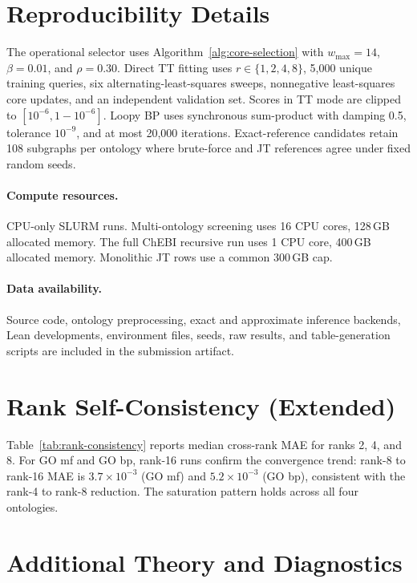 \documentclass[12pt]{article}
\begin{document}
\section{Reproducibility Details}
\label{app:reproducibility}

The operational selector uses Algorithm~\ref{alg:core-selection} with
$w_{\max}=14$, $\beta=0.01$, and $\rho=0.30$. Direct TT fitting uses
$r\in\{1,2,4,8\}$, 5,000 unique training queries, six
alternating-least-squares sweeps, nonneg\-ative least-squares core
updates, and an independent validation set. Scores in TT mode are
clipped to $[10^{-6},1-10^{-6}]$. Loopy BP uses synchronous
sum-product with damping 0.5, tolerance $10^{-9}$, and at most 20,000
iterations. Exact-reference candidates retain 108 subgraphs per
ontology where brute-force and JT references agree under fixed random
seeds.

\paragraph{Compute resources.}
CPU-only SLURM runs. Multi-ontology screening uses 16 CPU cores,
128\,GB allocated memory. The full ChEBI recursive run uses 1 CPU core,
400\,GB allocated memory. Monolithic JT rows use a common 300\,GB cap.

\paragraph{Data availability.}
Source code, ontology preprocessing, exact and approximate inference
backends, Lean developments, environment files, seeds, raw results, and
table-generation scripts are included in the submission artifact.

\section{Rank Self-Consistency (Extended)}
\label{app:rank-consistency}

Table~\ref{tab:rank-consistency} reports median cross-rank MAE for ranks
2, 4, and 8. For GO mf and GO bp, rank-16 runs confirm the convergence
trend: rank-8 to rank-16 MAE is $3.7\times10^{-3}$ (GO mf) and
$5.2\times10^{-3}$ (GO bp), consistent with the rank-4 to rank-8
reduction. The saturation pattern holds across all four ontologies.

\section{Additional Theory and Diagnostics}
\label{app:additional-theory}
\end{document}
